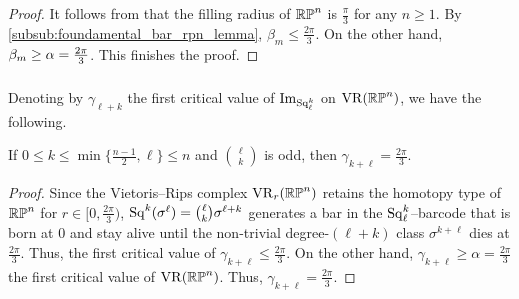 \begin{proof}%
	It follows from \cite{katz1983filling} that the filling radius of $\mathbb{RP}^n$ is $\frac{\pi}{3}$ for any $n \geq 1$.
	By \cref{subsub:foundamental_bar_rpn_lemma}, $\beta_m\leq \tfrac{2\pi}{3}$.
    On the other hand, $\beta_m\geq \alpha = \tfrac{2\pi}{3}$.
    This finishes the proof.
\end{proof}

\subsubsection{}\label{subsub:gamma_rpn}

Denoting by \(\gamma_{\ell+k}\) the first critical value of \(\operatorname{Im}_{\operatorname{Sq}^k_\ell}\) on \(\operatorname{VR}(\mathbb{RP}^n)\), we have the following.

\medskip\proposition
If $0 \leq k \leq \min\{\frac{n-1}{2}, \ell\} \leq n$ and $\binom{\ell}{k}$ is odd, then $\gamma_{k+\ell} = \tfrac{2\pi}{3}$.

\begin{proof}
	Since the Vietoris--Rips complex $\operatorname{VR}_r(\mathbb{RP}^n)$ retains the homotopy type of $\mathbb{RP}^n$ for $r \in [0,\tfrac{2\pi}{3})$, $\operatorname{Sq}^k(\sigma^\ell) = \binom{\ell}{k}\sigma^{\ell+k}$ generates a bar in the $\operatorname{Sq}^k_\ell$--barcode that is born at $0$ and stay alive until the non-trivial degree-$(\ell+k)$ class $\sigma^{k+\ell}$ dies at $\tfrac{2\pi}{3}$.
	Thus, the first critical value of $\gamma_{k+\ell} \leq \tfrac{2\pi}{3}$.
	On the other hand, $\gamma_{k+\ell} \geq \alpha = \tfrac{2\pi}{3}$ the first critical value of $\operatorname{VR}(\mathbb{RP}^n)$.
	Thus, $\gamma_{k+\ell} = \tfrac{2\pi}{3}$.
\end{proof}
